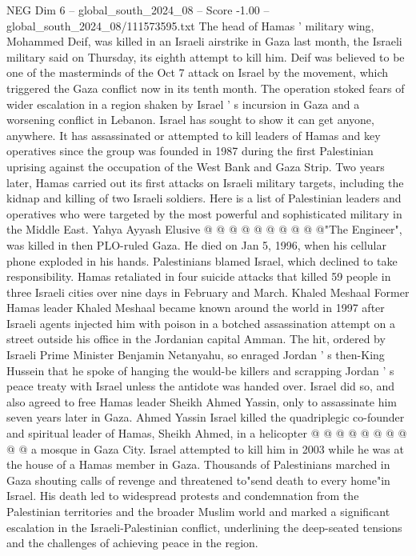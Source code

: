 \begin{textsample}{NEG Dim 6 – global\_south\_2024\_08 – Score -1.00 – global\_south\_2024\_08/111573595.txt}  \label{ex:f6_neg_136}
The head of Hamas ' military wing, Mohammed Deif, was killed in an Israeli airstrike in Gaza last month, the Israeli military said on Thursday, its eighth attempt to kill him.
Deif was believed to be one of the masterminds of the Oct 7 attack on Israel by the movement, which triggered the Gaza conflict now in its tenth month.
The operation stoked fears of wider escalation in a region shaken by Israel ' s incursion in Gaza and a worsening conflict in Lebanon.
Israel has sought to show it can get anyone, anywhere.
It has assassinated or attempted to kill leaders of Hamas and key operatives since the group was founded in 1987 during the first Palestinian uprising against the occupation of the West Bank and Gaza Strip.
Two years later, Hamas carried out its first attacks on Israeli military targets, including the kidnap and killing of two Israeli soldiers.
Here is a list of Palestinian leaders and operatives who were targeted by the most powerful and sophisticated military in the Middle East.
Yahya Ayyash Elusive @ @ @ @ @ @ @ @ @ @"The Engineer", was killed in then PLO-ruled Gaza.
He died on Jan 5, 1996, when his cellular phone exploded in his hands.
Palestinians blamed Israel, which declined to take responsibility.
Hamas retaliated in four suicide attacks that killed 59 people in three Israeli cities over nine days in February and March.
Khaled Meshaal Former Hamas leader Khaled Meshaal became known around the world in 1997 after Israeli agents injected him with poison in a botched assassination attempt on a street outside his office in the Jordanian capital Amman.
The hit, ordered by Israeli Prime Minister Benjamin Netanyahu, so enraged Jordan ' s then-King Hussein that he spoke of hanging the would-be killers and scrapping Jordan ' s peace treaty with Israel unless the antidote was handed over.
Israel did so, and also agreed to free Hamas leader Sheikh Ahmed Yassin, only to assassinate him seven years later in Gaza.
Ahmed Yassin Israel killed the quadriplegic co-founder and spiritual leader of Hamas, Sheikh Ahmed, in a helicopter @ @ @ @ @ @ @ @ @ @ a mosque in Gaza City.
Israel attempted to kill him in 2003 while he was at the house of a Hamas member in Gaza.
Thousands of Palestinians marched in Gaza shouting calls of revenge and threatened to"send death to every home"in Israel.
His death led to widespread protests and condemnation from the Palestinian territories and the broader Muslim world and marked a significant escalation in the Israeli-Palestinian conflict, underlining the deep-seated tensions and the challenges of achieving peace in the region.

\end{textsample}
